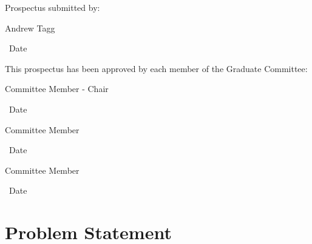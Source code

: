 \documentclass[12pt, letterpaper]{article}
\begin{document}
\hspace*{.47in}
\begin{minipage}[c]{5.25in}

\normalsize

Prospectus submitted by:

\vspace{.5in}

\makebox[2in]{\hrulefill} \hspace{1in} \makebox[2in]{\hrulefill}

\parbox[b]{3in}{Andrew Tagg} \, Date
\vspace{0.5in}

This prospectus has been approved by each member of the Graduate Committee:
\vspace{0.5in}

\makebox[2in]{\hrulefill} \hspace{1in} \makebox[2in]{\hrulefill}

\parbox[b]{3in}{Committee Member - Chair} \, Date
\vspace{0.4in}

\makebox[2in]{\hrulefill} \hspace{1in} \makebox[2in]{\hrulefill}

\parbox[b]{3in}{Committee Member} \, Date
\vspace{0.4in}

\makebox[2in]{\hrulefill} \hspace{1in} \makebox[2in]{\hrulefill}

\parbox[b]{3in}{Committee Member} \, Date

\end{minipage}

\vspace*{\fill}

\pagebreak

\setcounter{page}{1}


\section{Problem Statement}
\end{document}
